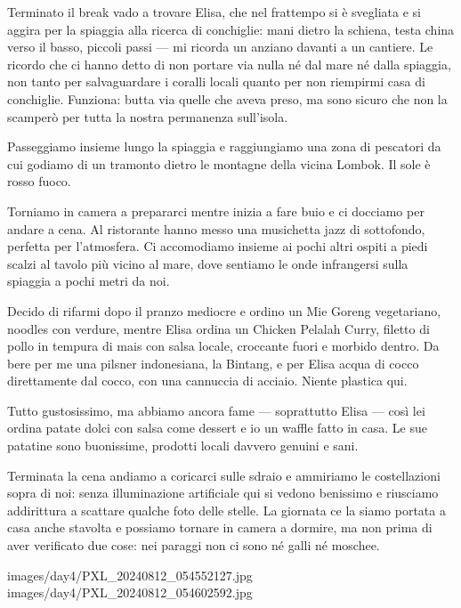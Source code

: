 Terminato il break vado a trovare Elisa, che nel frattempo si è svegliata e si aggira per la spiaggia alla ricerca di conchiglie: mani dietro la schiena, testa china verso il basso, piccoli passi — mi ricorda un anziano davanti a un cantiere. Le ricordo che ci hanno detto di non portare via nulla né dal mare né dalla spiaggia, non tanto per salvaguardare i coralli locali quanto per non riempirmi casa di conchiglie. Funziona: butta via quelle che aveva preso, ma sono sicuro che non la scamperò per tutta la nostra permanenza sull'isola.

Passeggiamo insieme lungo la spiaggia e raggiungiamo una zona di pescatori da cui godiamo di un tramonto dietro le montagne della vicina Lombok. Il sole è rosso fuoco.

Torniamo in camera a prepararci mentre inizia a fare buio e ci docciamo per andare a cena. Al ristorante hanno messo una musichetta jazz di sottofondo, perfetta per l'atmosfera. Ci accomodiamo insieme ai pochi altri ospiti a piedi scalzi al tavolo più vicino al mare, dove sentiamo le onde infrangersi sulla spiaggia a pochi metri da noi.

Decido di rifarmi dopo il pranzo mediocre e ordino un Mie Goreng vegetariano, noodles con verdure, mentre Elisa ordina un Chicken Pelalah Curry, filetto di pollo in tempura di mais con salsa locale, croccante fuori e morbido dentro. Da bere per me una pilsner indonesiana, la Bintang, e per Elisa acqua di cocco direttamente dal cocco, con una cannuccia di acciaio. Niente plastica qui.

Tutto gustosissimo, ma abbiamo ancora fame — soprattutto Elisa — così lei ordina patate dolci con salsa come dessert e io un waffle fatto in casa. Le sue patatine sono buonissime, prodotti locali davvero genuini e sani.

Terminata la cena andiamo a coricarci sulle sdraio e ammiriamo le costellazioni sopra di noi: senza illuminazione artificiale qui si vedono benissimo e riusciamo addirittura a scattare qualche foto delle stelle. La giornata ce la siamo portata a casa anche stavolta e possiamo tornare in camera a dormire, ma non prima di aver verificato due cose: nei paraggi non ci sono né galli né moschee.


\pagestyle{empty} %

                        {images/day4/PXL_20240812_054552127.jpg} 
                        {images/day4/PXL_20240812_054602592.jpg}
%

